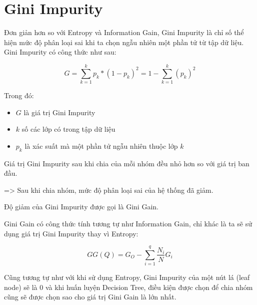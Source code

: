 \section{Gini Impurity}
Đơn giản hơn so với Entropy và Information Gain, Gini Impurity
là chỉ số thể hiện mức độ phân loại sai khi ta chọn ngẫu nhiên
một phần tử từ tập dữ liệu. Gini Impurity có công thức như sau:

\begin{equation*}
    G = \sum_{k=1}^{k}p_k*(1-p_k)^2 = 1 - \sum_{k=1}^{k}(p_k)^2
\end{equation*}

Trong đó:
\begin{itemize}
    \item $G$ là giá trị Gini Impurity
    \item $k$ số các lớp có trong tập dữ liệu
    \item $p_k$ là xác suất mà một phần tử ngẫu nhiên thuộc lớp $k$
\end{itemize}

Giá trị Gini Impurity sau khi chia của mỗi nhóm đều nhỏ hơn so với
giá trị ban đầu.

=> Sau khi chia nhóm, mức độ phân loại sai của hệ thống đã giảm.

Độ giảm của Gini Impurity được gọi là Gini Gain.

Gini Gain có công thức tính tương tự như Information Gain,
chỉ khác là ta sẽ sử dụng giá trị Gini Impurity thay vì Entropy:

\begin{equation*}
    GG(Q) = G_O - \sum_{i=1}^{q}\frac{N_i}{N}G_i
\end{equation*}

Cũng tương tự như với khi sử dụng Entropy, Gini Impurity của một nút lá
(leaf node) sẽ là 0 và khi huấn luyện Decision Tree, điều kiện được chọn
để chia nhóm cũng sẽ được chọn sao cho giá trị Gini Gain là lớn nhất.
